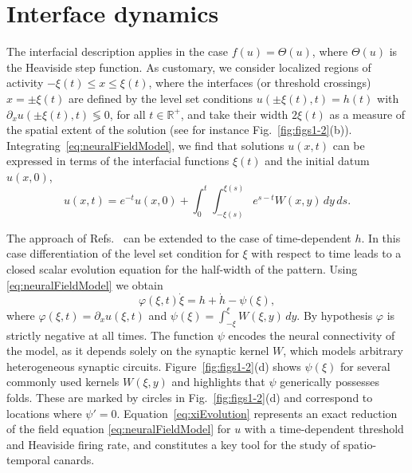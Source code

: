 \documentclass[aps,prl,reprint,superscriptaddress]{revtex4-1}
\newcommand{\RSet}{\mathbb{R}}
\newcommand{\edits}[1]{#1}
\begin{document}
\section{\label{sec:interface}Interface dynamics}
The interfacial description \cite{Coombes2012aa} applies in the case 
$f(u)=\Theta(u)$, where $\Theta(u)$ is the Heaviside step function.
As customary, we consider localized regions of activity 
$-\xi(t)\le x\le\xi(t)$, where the interfaces (or threshold crossings) 
$x=\pm \xi(t)$ are defined by the level set conditions $u(\pm \xi(t),t) = h(t)$ 
with $\partial_x u(\pm \xi(t),t) \lessgtr 0$, for all $t \in \RSet^+$,
and take their width $2 \xi(t)$ as a measure of the spatial
extent of the solution (see for instance Fig.~\ref{fig:figs1-2}(b)). 
Integrating~\eqref{eq:neuralFieldModel}, we find that solutions
$u(x,t)$ can be expressed in terms of the interfacial functions
$\xi(t)$ and the initial datum $u(x,0)$,
\begin{equation}\label{eq:uSolution}
u(x,t) = e^{-t} u(x,0) + \int_0^t \int_{-\xi(s)}^{\xi(s)} e^{s-t} W(x,y) \, dy \, ds.
\end{equation}

\edits{The approach of Refs.~\cite{Coombes2011aa,Coombes2012aa} can be extended to the case of
time-dependent $h$. In this case differentiation of the level set condition for $\xi$
with respect to time leads to a closed scalar evolution equation for the half-width
of the pattern. Using \eqref{eq:neuralFieldModel} we obtain}
\begin{equation}\label{eq:xiEvolution}
\varphi(\xi,t) \dot \xi = h + \dot h - \psi(\xi),
\end{equation}
where $\varphi(\xi,t) = \partial_x u(\xi,t)$ and
$\psi(\xi) = \int_{-\xi}^\xi W(\xi,y) \, dy$. By hypothesis $\varphi$ is 
strictly negative at all times. The function $\psi$ encodes the neural 
connectivity of the model, as it depends solely on the synaptic kernel 
$W$, which models arbitrary heterogeneous synaptic circuits.
Figure~\ref{fig:figs1-2}(d) shows $\psi(\xi)$ for several commonly
used kernels $W(\xi,y)$ and \edits{highlights that $\psi$ generically possesses folds.
These are marked by circles in Fig.~\ref{fig:figs1-2}(d) and correspond to locations
where $\psi'=0$.}
Equation~\eqref{eq:xiEvolution} represents an exact reduction of the field 
equation \eqref{eq:neuralFieldModel} for $u$ with a time-dependent threshold and Heaviside
firing rate, and constitutes a key tool for the study of spatio-temporal
canards. 
\end{document}

